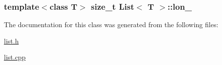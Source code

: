 \subsubsection[{lon\+\_\+}]{\setlength{\rightskip}{0pt plus 5cm}template$<$class T$>$ size\+\_\+t {\bf List}$<$ T $>$\+::lon\+\_\+\hspace{0.3cm}{\ttfamily [private]}}\label{class_list_a5296e3adef5445b4ac96f426bd1eba53}


The documentation for this class was generated from the following files\+:\begin{DoxyCompactItemize}
\item 
\hyperlink{list_8h}{list.\+h}\item 
\hyperlink{list_8cpp}{list.\+cpp}\end{DoxyCompactItemize}
